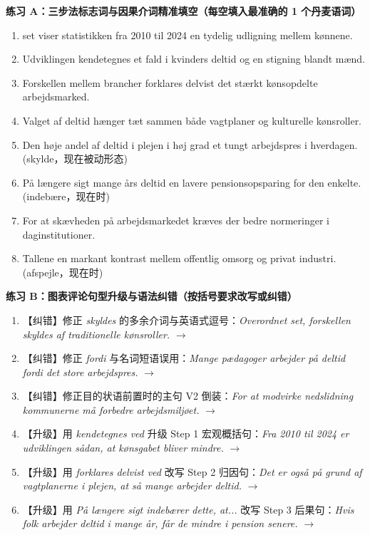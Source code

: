 \textbf{练习 A：三步法标志词与因果介词精准填空（每空填入最准确的 1 个丹麦语词）}
\begin{enumerate}
  \item \underline{\hspace{2.2cm}} set viser statistikken fra 2010 til 2024 en tydelig udligning mellem kønnene.
  \item Udviklingen kendetegnes \underline{\hspace{2.2cm}} et fald i kvinders deltid og en stigning blandt mænd.
  \item Forskellen mellem brancher forklares delvist \underline{\hspace{2.2cm}} det stærkt kønsopdelte arbejdsmarked.
  \item Valget af deltid hænger tæt sammen \underline{\hspace{2.2cm}} både vagtplaner og kulturelle kønsroller.
  \item Den høje andel af deltid i plejen \underline{\hspace{2.2cm}} i høj grad et tungt arbejdspres i hverdagen. (skylde，现在被动形态)
  \item På længere sigt \underline{\hspace{2.2cm}} mange års deltid en lavere pensionsopsparing for den enkelte. (indebære，现在时)
  \item For at \underline{\hspace{2.2cm}} skævheden på arbejdsmarkedet kræves der bedre normeringer i daginstitutioner.
  \item Tallene \underline{\hspace{2.2cm}} en markant kontrast mellem offentlig omsorg og privat industri. (afspejle，现在时)
\end{enumerate}

\newpage
\textbf{练习 B：图表评论句型升级与语法纠错（按括号要求改写或纠错）}
\begin{enumerate}
  \item 【纠错】修正 \textit{skyldes} 的多余介词与英语式逗号：\textit{Overordnet set, forskellen skyldes af traditionelle kønsroller.} $\rightarrow$
  \item 【纠错】修正 \textit{fordi} 与名词短语误用：\textit{Mange pædagoger arbejder på deltid fordi det store arbejdspres.} $\rightarrow$
  \item 【纠错】修正目的状语前置时的主句 V2 倒装：\textit{For at modvirke nedslidning kommunerne må forbedre arbejdsmiljøet.} $\rightarrow$
  \item 【升级】用 \textit{kendetegnes ved} 升级 Step 1 宏观概括句：\textit{Fra 2010 til 2024 er udviklingen sådan, at kønsgabet bliver mindre.} $\rightarrow$
  \item 【升级】用 \textit{forklares delvist ved} 改写 Step 2 归因句：\textit{Det er også på grund af vagtplanerne i plejen, at så mange arbejder deltid.} $\rightarrow$
  \item 【升级】用 \textit{På længere sigt indebærer dette, at...} 改写 Step 3 后果句：\textit{Hvis folk arbejder deltid i mange år, får de mindre i pension senere.} $\rightarrow$
\end{enumerate}

